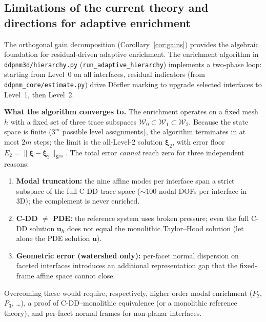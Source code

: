 \documentclass[11pt,a4paper]{article}
\theoremstyle{definition}
\newcommand{\vel}{\bm{u}}
\newcommand{\Schur}{\mathbf{S}}
\newcommand{\Shatuu}{\widehat{\Schur}{}^{uu}}
\newcommand{\Wspace}{\mathcal{W}}
\begin{document}
\subsection{Limitations of the current theory and directions for adaptive enrichment}

The orthogonal gain decomposition (Corollary~\ref{cor:gains})
provides the algebraic foundation for residual-driven adaptive
enrichment.  The enrichment algorithm in
\texttt{ddpnm3d/hierarchy.py}
(\texttt{run\_adaptive\_hierarchy}) implements a two-phase loop:
starting from Level~0 on all interfaces, residual indicators
(from \texttt{ddpnm\_core/estimate.py}) drive D\"orfler
  marking to
upgrade selected interfaces to Level~1, then Level~2.

\textbf{What the algorithm converges to.}
The enrichment operates on a fixed mesh $h$ with a fixed set of
three trace subspaces $\Wspace_0\subset\Wspace_1\subset\Wspace_2$.
Because the state space is finite ($3^m$ possible level assignments),
the algorithm terminates in at most $2m$ steps; the limit is the
all-Level-2 solution $\bm{\xi}_2$, with error floor
$E_2 = \|\bm{\xi}-\bm{\xi}_2\|_{\Shatuu}$.
The total error \emph{cannot} reach zero for three independent reasons:
\begin{enumerate}[nosep,leftmargin=*]
  \item \textbf{Modal truncation:} the nine affine modes per interface
    span a strict subspace of the full C-DD trace space (${\sim}100$
    nodal DOFs per interface in 3D); the complement is never enriched.
  \item \textbf{C-DD $\neq$ PDE:} the reference system uses broken
    pressure; even the full C-DD solution $\vel_h$ does not equal the
    monolithic Taylor--Hood solution (let alone the PDE solution $\vel$).
  \item \textbf{Geometric error (watershed only):} per-facet normal
    dispersion on faceted interfaces introduces an additional
    representation gap that the fixed-frame affine space cannot close.
\end{enumerate}
Overcoming these would require, respectively, higher-order modal
enrichment ($P_2$, $P_3$, \dots), a proof of C-DD--monolithic
equivalence (or a monolithic reference theory), and per-facet normal
frames for non-planar interfaces.
\end{document}

